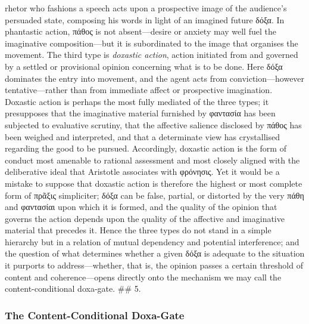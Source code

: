 \documentclass{article}
\begin{document}
rhetor who fashions a speech acts upon a prospective image of the audience's persuaded state, composing his words in light of an imagined future δόξα. In phantastic action, πάθος is not absent—desire or anxiety may well fuel the imaginative composition—but it is subordinated to the image that organises the movement. The third type is \textit{doxastic action}, action initiated from and governed by a settled or provisional opinion concerning what is to be done. Here δόξα dominates the entry into movement, and the agent acts from conviction—however tentative—rather than from immediate affect or prospective imagination. Doxastic action is perhaps the most fully mediated of the three types; it presupposes that the imaginative material furnished by φαντασία has been subjected to evaluative scrutiny, that the affective salience disclosed by πάθος has been weighed and interpreted, and that a determinate view has crystallised regarding the good to be pursued. Accordingly, doxastic action is the form of conduct most amenable to rational assessment and most closely aligned with the deliberative ideal that Aristotle associates with φρόνησις. Yet it would be a mistake to suppose that doxastic action is therefore the highest or most complete form of πρᾶξις simpliciter; δόξα can be false, partial, or distorted by the very πάθη and φαντασίαι upon which it is formed, and the quality of the opinion that governs the action depends upon the quality of the affective and imaginative material that precedes it. Hence the three types do not stand in a simple hierarchy but in a relation of mutual dependency and potential interference; and the question of what determines whether a given δόξα is adequate to the situation it purports to address—whether, that is, the opinion passes a certain threshold of content and coherence—opens directly onto the mechanism we may call the content-conditional doxa-gate. ## 5. 

\subsubsection*{The Content-Conditional Doxa-Gate}
\end{document}
